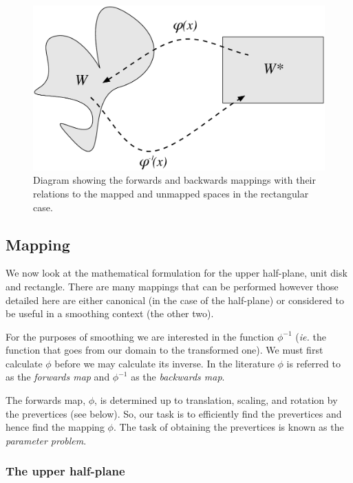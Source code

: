 \begin{figure} [tbp]
\centering
\includegraphics[scale=0.5]{sc/figs/mappingdia.pdf}
\caption{Diagram showing the forwards and backwards mappings with their relations to the mapped and unmapped spaces in the rectangular case.}
\label{mappingdia}
\end{figure}

\subsection{\sch Mapping}
\label{schparprob}
We now look at the mathematical formulation for the upper half-plane, unit disk and rectangle. There are many mappings that can be performed however those detailed here are either canonical (in the case of the half-plane) or considered to be useful in a smoothing context (the other two).

For the purposes of smoothing we are interested in the function $\phi^{-1}$ (\emph{ie.} the function that goes from our domain to the transformed one). We must first calculate $\phi$ before we may calculate its inverse. In the literature $\phi$ is referred to as the \emph{forwards map} and $\phi^{-1}$ as the \emph{backwards map}.

The forwards map, $\phi$, is determined up to translation, scaling, and rotation by the prevertices (see below). So, our task is to efficiently find the prevertices and hence find the mapping $\phi$. The task of obtaining the prevertices is known as the \emph{\sch parameter problem}.

\subsubsection{The upper half-plane}
\label{sc-parprob}

